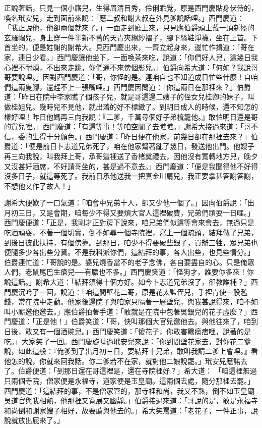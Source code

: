 正說著話，只見一個小廝兒，生得眉清目秀，伶俐乖覺，原是西門慶貼身伏侍的，喚名玳安兒，走到面前來說：「應二叔和謝大叔在外見爹說話哩。」西門慶道： 「我正說他，他卻兩個就來了。」一面走到廳上來，只見應伯爵頭上戴一頂新盔的玄羅帽兒，身上穿一件半新不舊的天青夾縐紗褶子，腳下絲鞋淨襪，坐在上首。下首坐的，便是姓謝的謝希大。見西門慶出來，一齊立起身來，邊忙作揖道：「哥在家，連日少看。」西門慶讓他坐下，一面喚茶來吃，說道：「你們好人兒，這幾日我心裡不耐煩，不出來走跳，你們通不來傍個影兒。」伯爵向希大道：「何如？我說哥哥要說哩。」因對西門慶道：「哥，你怪的是。連咱自也不知道成日忙些什麼！自咱們這兩隻腳，還趕不上一張嘴哩。」西門慶因問道：「你這兩日在那裡來？」伯爵道：「昨日在院中李家瞧了個孩子兒，就是哥這邊二嫂子的侄女兒桂卿的妹子，叫做桂姐兒。幾時兒不見他，就出落的好不標緻了。到明日成人的時候，還不知怎的樣好哩！昨日他媽再三向我說：『二爹，千萬尋個好子弟梳籠他。』敢怕明日還是哥的貨兒哩。」西門慶道：「有這等事！等咱空閒了去瞧瞧。」謝希大接過來道：「哥不信，委的生得十分顏色。」西門慶道：「昨日便在他家，前幾日卻在那裡去來？」伯爵道：「便是前日卜志道兄弟死了，咱在他家幫著亂了幾日，發送他出門。他嫂子再三向我說，叫我拜上哥，承哥這裡送了香楮奠禮去，因他沒有寬轉地方兒，晚夕又沒甚好酒席，不好請哥坐的，甚是過不意去。」西門慶道：「便是我聞得他不好得沒多日子，就這等死了。我前日承他送我一把真金川扇兒，我正要拿甚答謝答謝，不想他又作了故人！」

謝希大便歎了一口氣道：「咱會中兄弟十人，卻又少他一個了。」因向伯爵說：「出月初三日，又是會期，咱每少不得又要煩大官人這裡破費，兄弟們頑耍一日哩。」西門慶便道：「正是，我剛才正對房下說來，咱兄弟們似這等會來會去，無過只是吃酒頑耍，不著一個切實，倒不如尋一個寺院裡，寫上一個疏頭，結拜做了兄弟，到後日彼此扶持，有個傍靠。到那日，咱少不得要破些銀子，買辦三牲，眾兄弟也便隨多少各出些分資。不是我科派你們，這結拜的事，各人出些，也見些情分。」伯爵連忙道：「哥說的是。婆兒燒香當不的老子念佛，各自要盡自的心。只是俺眾人們，老鼠尾巴生瘡兒──有膿也不多。」西門慶笑道：「怪狗才，誰要你多來！你說這話。」謝希大道：「結拜須得十個方好。如今卜志道兄弟沒了，卻教誰補？」西門慶沉吟了一回，說道：「咱這間壁花二哥，原是花太監侄兒，手裡肯使一股濫錢，常在院中走動。他家後邊院子與咱家只隔著一層壁兒，與我甚說得來，咱不如叫小廝邀他邀去。」應伯爵拍著手道：「敢就是在院中包著吳銀兒的花子虛麼？」西門慶道：「正是他！」伯爵笑道：「哥，快叫那個大官兒邀他去。與他往來了，咱到日後，敢又有一個酒碗兒。」西門慶笑道：「傻花子，你敢害饞癆痞哩，說著的是吃。」大家笑了一回。西門慶旋叫過玳安兒來說：「你到間壁花家去，對你花二爹說，如此這般：『俺爹到了出月初三日，要結拜十兄弟，敢叫我請二爹上會哩。』看他怎的說，你就來回我話。你二爹若不在家，就對他二娘說罷。」玳安兒應諾去了。伯爵便道：「到那日還在哥這裡是，還在寺院裡好？」希大道： 「咱這裡無過只兩個寺院，僧家便是永福寺，道家便是玉皇廟。這兩個去處，隨分那裡去罷。」西門慶道：「這結拜的事，不是僧家管的，那寺裡和尚，我又不熟，倒不如玉皇廟吳道官與我相熟，他那裡又寬展又幽靜。」伯爵接過來道：「哥說的是，敢是永福寺和尚倒和謝家嫂子相好，故要薦與他去的。」希大笑罵道：「老花子，一件正事，說說就放出屁來了。」

